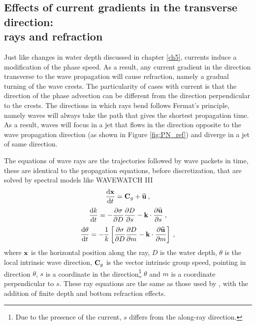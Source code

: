 \subsection{Effects of current gradients in the transverse direction:\\
rays and refraction}
Just like changes in water depth discussed in chapter \ref{ch5}, currents induce a modification of the phase speed. 
As a result, any current gradient in the direction transverse to the wave propagation 
will cause refraction, namely a gradual turning of the wave crests. 
The particularity of cases with current is that the direction of the phase advection 
can be different from the direction perpendicular to the crests. The directions in which rays bend follows Fermat's principle, namely waves 
will always take the path that gives the shortest propagation time. As a result, waves will focus in a jet  that flows in the direction 
opposite to the wave propagation direction (as shown in Figure \ref{fig:PN_ref}) 
and diverge in a jet of same direction.


The equations of wave rays are the trajectories followed by wave packets in time, these are identical to the propagation equations, before discretization,  
that are solved by spectral models like WAVEWATCH III \citep[equations 2.9 to 2.11 in][]{Tolman&al.2014}
\begin{equation}
\frac{{\mathrm d} \mathbf{x}}{{\mathrm d} t} = {\bf C}_g + \widehat{\mathbf{u}} \: , \label{eq:x_dot}
\end{equation}
\begin{equation}
\frac{{\mathrm d} k}{{\mathrm d} t} = - \frac{\partial \sigma}{\partial D}
\frac{\partial D}{\partial s} - {{\mathbf k}} \cdot
\frac{\partial \widehat{\mathbf{u}}}{\partial s} \: , \label{eq:k_dot}
\end{equation}
\begin{equation}
\frac{{\mathrm d} \theta}{{\mathrm d} t} = - \frac{1}{k} \left [
\frac{\partial \sigma}{\partial D} \frac{\partial D}{\partial m}
- {{\mathbf k}} \cdot \frac{\partial \widehat{\mathbf{u}}}{\partial m}
\right ] \: , \label{eq:theta_dot}
\end{equation}
where $\bf x$ is the horizontal position along the ray, $D$ is the water depth, $\theta$ is the local intrinsic wave direction, 
 ${\bf C}_g$ is the vector intrinsic group speed, pointing in direction ${\theta}$, $s$ is a coordinate in the
direction\footnote{Due to the presence of the current, $s$ differs 
from the along-ray direction.} $\theta$ and $m$ is a coordinate perpendicular to $s$. 
  These ray equations are the same as those used 
 by \cite{Mathisen1987}, with the addition of finite depth and bottom refraction effects. 

